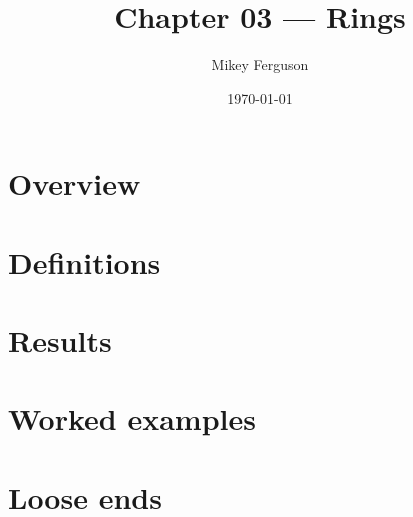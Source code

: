 \documentclass[11pt]{article}
\title{Chapter 03 --- Rings}
\author{Mikey Ferguson}
\date{\today}
\begin{document}
\maketitle
\tableofcontents
\bigskip

\section{Overview}

\section{Definitions}

\section{Results}

\section{Worked examples}

\section{Loose ends}
\end{document}

